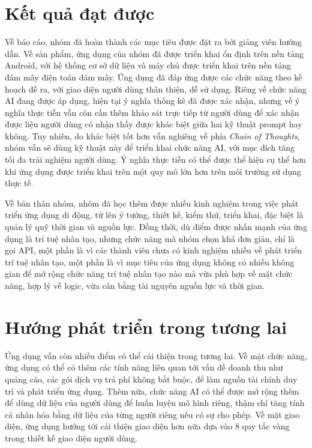 \documentclass{uetgraduation}
\begin{document}
\section{Kết quả đạt được}
Về báo cáo, nhóm đã hoàn thành các mục tiêu được đặt ra bởi giảng viên hướng dẫn. Về sản phẩm, ứng dụng của nhóm đã được triển khai
ổn định trên nền tảng Android, với hệ thống cơ sở dữ liệu và máy chủ được triển khai trên nền tảng đám mây điện toán đám mây. Ứng dụng đã
đáp ứng được các chức năng theo kế hoạch đề ra, với giao diện người dùng thân thiện, dễ sử dụng. Riêng về chức năng AI đang được áp dụng, 
hiện tại ý nghĩa thống kê đã được xác nhận, nhưng về ý nghĩa thực tiễn vẫn còn cần thêm khảo sát trực tiếp từ người dùng để xác nhận được liệu 
người dùng có nhận thấy được khác biệt giữa hai kỹ thuật prompt hay không. Tuy nhiên, do khác biệt tốt hơn vẫn nghiêng về phía \textit{Chain of Thoughts}, 
nhóm vẫn sẽ dùng kỹ thuật này để triển khai chức năng AI, với mục đích tăng tối đa trải nghiệm người dùng. Ý nghĩa thực tiễn có thể được thể hiện cụ thể hơn 
khi ứng dụng được triển khai trên một quy mô lớn hơn trên môi trường sử dụng thực tế.
\par
Về bản thân nhóm, nhóm đã học thêm được nhiều kinh nghiệm trong việc phát triển ứng dụng di động, từ lên ý tưởng, thiết kế, kiểm thử, triển khai, đặc biệt là quản lý quỹ thời gian và nguồn lực. 
Đồng thời, dù điểm được nhấn mạnh của ứng dụng là trí tuệ nhân tạo, nhưng chức năng mà nhóm chọn khá đơn giản, chỉ là gọi API, một phần là vì các thành viên chưa có kinh nghiệm nhiều về phát triển trí tuệ nhân tạo, một phần là vì
mục tiêu của ứng dụng không có nhiều không gian để mở rộng chức năng trí tuệ nhân tạo nào mà vừa phù hợp về mặt chức năng, hợp lý về logic, vừa cân bằng tài nguyên nguồn lực và thời gian.
\section{Hướng phát triển trong tương lai}
Ứng dụng vẫn còn nhiều điểm có thể cải thiện trong tương lai. Về mặt chức năng, ứng dụng có thể có thêm các tính năng liên quan tới vấn đề doanh thu như quảng cáo, 
các gói dịch vụ trả phí không bắt buộc, để làm nguồn tài chính duy trì và phát triển ứng dụng. Thêm nữa, chức năng AI có thể được mở rộng thêm để dùng dữ liệu của người dùng 
để huấn luyện mô hình riêng, thậm chí tăng tính cá nhân hóa bằng dữ liệu của từng người riêng nếu có sự cho phép.
Về mặt giao diện, ứng dụng hướng tới cải thiện giao diện hơn nữa dựa vào 8 quy tắc vàng trong thiết kế giao diện người dùng.\cite{shneider}
\end{document}
